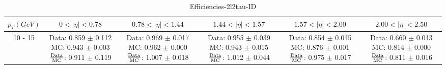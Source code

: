 \documentclass[final,letterpaper,twoside,12pt]{article}
\begin{document}
\begin{table}[htbp]
\begin{adjustwidth}{-4em}{-4em}
\centering
\begin{tabular}{|c|c|c|c|c|c|} \hline 
$p_{T} (GeV)$& $0 < |\eta| < 0.78$ & $0.78 < |\eta| < 1.44$ & $1.44 < |\eta| < 1.57$ & $1.57 < |\eta| < 2.00$ & $2.00 < |\eta| < 2.50$  \\ 
\hline \hline 
10 - 15 & \parbox[c]{1.1 in}{ \scriptsize  Data: 0.859 $\pm$ 0.112 \newline MC: 0.943 $\pm$ 0.003 \newline $\frac{\rm{Data}}{\rm{MC}}$: 0.911 $\pm$ 0.119} & \parbox[c]{1.1 in}{ \scriptsize  Data: 0.969 $\pm$ 0.017 \newline MC: 0.962 $\pm$ 0.000 \newline $\frac{\rm{Data}}{\rm{MC}}$: 1.007 $\pm$ 0.018} & \parbox[c]{1.1 in}{ \scriptsize  Data: 0.955 $\pm$ 0.039 \newline MC: 0.943 $\pm$ 0.015 \newline $\frac{\rm{Data}}{\rm{MC}}$: 1.012 $\pm$ 0.044} & \parbox[c]{1.1 in}{ \scriptsize  Data: 0.854 $\pm$ 0.015 \newline MC: 0.876 $\pm$ 0.001 \newline $\frac{\rm{Data}}{\rm{MC}}$: 0.975 $\pm$ 0.017} & \parbox[c]{1.1 in}{ \scriptsize  Data: 0.660 $\pm$ 0.013 \newline MC: 0.814 $\pm$ 0.000 \newline $\frac{\rm{Data}}{\rm{MC}}$: 0.811 $\pm$ 0.016}\\ \hline 
\end{tabular}
\caption {Efficiencies-2l2tau-ID}
\label{tab:cqdata0}
\end{adjustwidth}\end{table}
\end{document}
